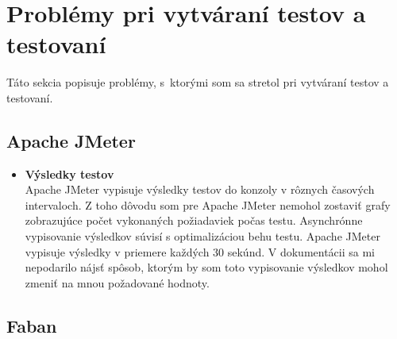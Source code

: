 \documentclass[12pt,oneside,final]{fithesis-utf8}
\begin{document}
\section{Problémy pri vytváraní testov a testovaní}
Táto sekcia popisuje problémy, s~ktorými som sa stretol pri vytváraní testov a testovaní.

\subsection{Apache JMeter}

\begin{itemize}

\item \textbf{Výsledky testov}\\
Apache JMeter vypisuje výsledky testov do konzoly v rôznych časových intervaloch. Z toho dôvodu som pre Apache JMeter nemohol zostaviť grafy zobrazujúce počet vykonaných požiadaviek počas testu. Asynchrónne vypisovanie výsledkov súvisí s optimalizáciou behu testu. Apache JMeter vypisuje výsledky v priemere každých 30 sekúnd. V dokumentácii sa mi nepodarilo nájsť spôsob, ktorým by som toto vypisovanie výsledkov mohol zmeniť na mnou požadované hodnoty.

\end{itemize}

\subsection{Faban}
\end{document}
